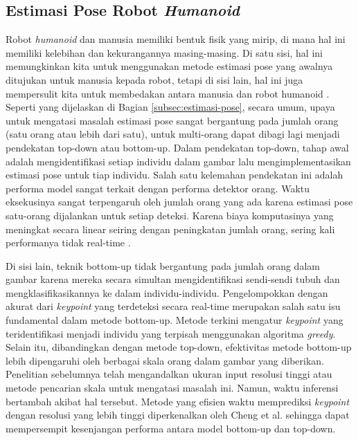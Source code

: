 \subsection{Estimasi Pose Robot \emph{Humanoid}}
\label{subsec:estimasi-pose-robot-humanoid}

Robot \emph{humanoid} dan manusia memiliki bentuk fisik yang mirip, di mana hal ini memiliki kelebihan dan kekurangannya masing-masing. Di satu sisi, hal ini memungkinkan kita untuk menggunakan metode estimasi pose yang awalnya ditujukan untuk manusia kepada robot, tetapi di sisi lain, hal ini juga mempersulit kita untuk membedakan antara manusia dan robot humanoid \parencite{amini2021}.
Seperti yang dijelaskan di Bagian \ref{subsec:estimasi-pose}, secara umum, upaya untuk mengatasi masalah estimasi pose sangat bergantung pada jumlah orang (satu orang atau lebih dari satu), untuk  multi-orang dapat dibagi lagi menjadi pendekatan top-down atau bottom-up.
Dalam pendekatan top-down, tahap awal adalah mengidentifikasi setiap individu dalam gambar lalu mengimplementasikan estimasi pose untuk tiap individu.
Salah satu kelemahan pendekatan ini adalah performa model sangat terkait dengan performa detektor orang. Waktu eksekusinya sangat terpengaruh oleh jumlah orang yang ada karena estimasi pose satu-orang dijalankan untuk setiap deteksi. Karena biaya komputasinya yang meningkat secara linear seiring dengan peningkatan jumlah orang, sering kali performanya tidak real-time \parencite{amini2021}.

Di sisi lain, teknik bottom-up tidak bergantung pada jumlah orang dalam gambar karena mereka secara simultan mengidentifikasi sendi-sendi tubuh dan mengklasifikasikannya ke dalam individu-individu. Pengelompokkan dengan akurat dari \emph{keypoint} yang terdeteksi secara real-time merupakan salah satu isu fundamental dalam metode bottom-up.
Metode terkini mengatur \emph{keypoint} yang teridentifikasi menjadi individu yang terpisah menggunakan algoritma \emph{greedy}. Selain itu, dibandingkan dengan metode top-down, efektivitas metode bottom-up lebih dipengaruhi oleh berbagai skala orang dalam gambar yang diberikan. Penelitian sebelumnya telah mengandalkan ukuran input resolusi tinggi \parencite{papandreou2018} atau metode pencarian skala \parencite{cao2019} untuk mengatasi masalah ini. Namun, waktu inferensi bertambah akibat hal tersebut.
Metode yang efisien waktu memprediksi \emph{keypoint} dengan resolusi yang lebih tinggi diperkenalkan oleh Cheng et al. \parencite{cheng2020} sehingga dapat mempersempit kesenjangan performa antara model bottom-up dan top-down.

